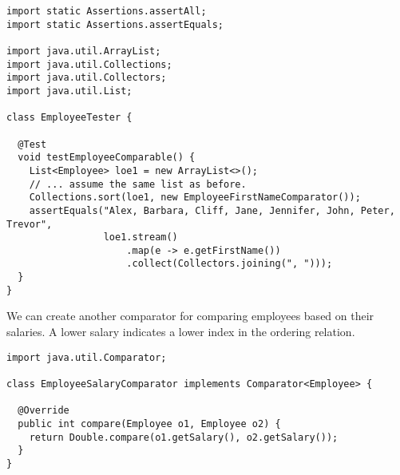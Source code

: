 \begin{lstlisting}[language=MyJava]
import static Assertions.assertAll;
import static Assertions.assertEquals;

import java.util.ArrayList;
import java.util.Collections;
import java.util.Collectors;
import java.util.List;

class EmployeeTester {

  @Test
  void testEmployeeComparable() {
    List<Employee> loe1 = new ArrayList<>();
    // ... assume the same list as before.
    Collections.sort(loe1, new EmployeeFirstNameComparator());
    assertEquals("Alex, Barbara, Cliff, Jane, Jennifer, John, Peter, Trevor",
                 loe1.stream()
                     .map(e -> e.getFirstName())
                     .collect(Collectors.joining(", ")));
  }
}
\end{lstlisting}

We can create another comparator for comparing employees based on their salaries. A lower salary indicates a lower index in the ordering relation.

\begin{lstlisting}[language=MyJava]
import java.util.Comparator;

class EmployeeSalaryComparator implements Comparator<Employee> {

  @Override
  public int compare(Employee o1, Employee o2) {
    return Double.compare(o1.getSalary(), o2.getSalary());
  }
}
\end{lstlisting}
